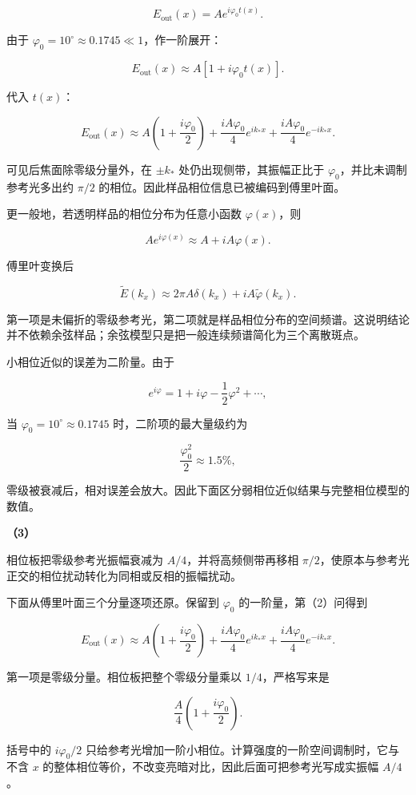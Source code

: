 \documentclass[12pt,a4paper,UTF8]{ctexart}
\begin{document}
\[E_{\mathrm{out}}(x)=Ae^{i\varphi_0t(x)}.\]

由于 \(\varphi_0=10^\circ\approx0.1745\ll1\)，作一阶展开：

\[E_{\mathrm{out}}(x)\approx A\left[1+i\varphi_0t(x)\right].\]

代入 \(t(x)\)：

\[E_{\mathrm{out}}(x)\approx
A\left(1+\frac{i\varphi_0}{2}\right)
+\frac{iA\varphi_0}{4}e^{ik_*x}
+\frac{iA\varphi_0}{4}e^{-ik_*x}.\]

可见后焦面除零级分量外，在 \(\pm k_*\) 处仍出现侧带，其振幅正比于
\(\varphi_0\)，并比未调制参考光多出约 \(\pi/2\)
的相位。因此样品相位信息已被编码到傅里叶面。

更一般地，若透明样品的相位分布为任意小函数 \(\varphi(x)\)，则

\[Ae^{i\varphi(x)}\approx A+iA\varphi(x).\]

傅里叶变换后

\[\widetilde E(k_x)
\approx2\pi A\delta(k_x)
+iA\widetilde\varphi(k_x).\]

第一项是未偏折的零级参考光，第二项就是样品相位分布的空间频谱。这说明结论并不依赖余弦样品；余弦模型只是把一般连续频谱简化为三个离散斑点。

小相位近似的误差为二阶量。由于

\[e^{i\varphi}=1+i\varphi-\frac12\varphi^2+\cdots,\]

当 \(\varphi_0=10^\circ\approx0.1745\) 时，二阶项的最大量级约为

\[\frac{\varphi_0^2}{2}\approx1.5\%,\]

零级被衰减后，相对误差会放大。因此下面区分弱相位近似结果与完整相位模型的数值。

\textbf{（3）}

相位板把零级参考光振幅衰减为 \(A/4\)，并将高频侧带再移相
\(\pi/2\)，使原本与参考光正交的相位扰动转化为同相或反相的振幅扰动。

下面从傅里叶面三个分量逐项还原。保留到 \(\varphi_0\)
的一阶量，第（2）问得到

\[E_{\mathrm{out}}(x)
\approx A\left(1+\frac{i\varphi_0}{2}\right)
+\frac{iA\varphi_0}{4}e^{ik_*x}
+\frac{iA\varphi_0}{4}e^{-ik_*x}.\]

第一项是零级分量。相位板把整个零级分量乘以 \(1/4\)，严格写来是

\[\frac A4\left(1+\frac{i\varphi_0}{2}\right).\]

括号中的 \(i\varphi_0/2\)
只给参考光增加一阶小相位。计算强度的一阶空间调制时，它与不含 \(x\)
的整体相位等价，不改变亮暗对比，因此后面可把参考光写成实振幅 \(A/4\)。
\end{document}

